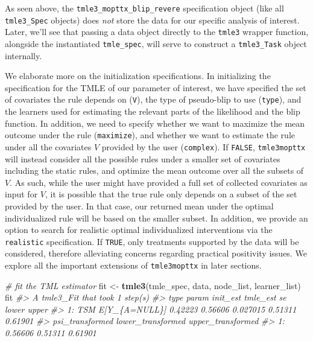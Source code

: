 \documentclass[12pt, krantz2,]{krantz}
\newenvironment{Shaded}{\begin{snugshade}}{\end{snugshade}}
\newcommand{\CommentTok}[1]{\textcolor[rgb]{0.37,0.37,0.37}{\textit{#1}}}
\newcommand{\KeywordTok}[1]{\textcolor[rgb]{0.27,0.27,0.27}{\textbf{#1}}}
\newcommand{\NormalTok}[1]{#1}
\newcommand{\StringTok}[1]{\textcolor[rgb]{0.5,0.5,0.5}{#1}}
\theoremstyle{definition}
\theoremstyle{definition}
\theoremstyle{definition}
\newcommand{\1}{\mathbbm{1}}
\begin{document}
As seen above, the \texttt{tmle3\_mopttx\_blip\_revere} specification object
(like all \texttt{tmle3\_Spec} objects) does \emph{not} store the data for our
specific analysis of interest. Later,
we'll see that passing a data object directly to the \texttt{tmle3} wrapper function,
alongside the instantiated \texttt{tmle\_spec}, will serve to construct a \texttt{tmle3\_Task}
object internally.

We elaborate more on the initialization specifications. In initializing the
specification for the TMLE of our parameter of interest, we have specified the
set of covariates the rule depends on (\texttt{V}), the type of pseudo-blip to use
(\texttt{type}), and the learners used for estimating the relevant parts of the
likelihood and the blip function. In addition, we need to specify whether we
want to maximize the mean outcome under the rule (\texttt{maximize}), and whether we
want to estimate the rule under all the covariates \(V\) provided by the user
(\texttt{complex}). If \texttt{FALSE}, \texttt{tmle3mopttx} will instead consider all the possible
rules under a smaller set of covariates including the static rules, and optimize
the mean outcome over all the subsets of \(V\). As such, while the user might have
provided a full set of collected covariates as input for \(V\), it is possible
that the true rule only depends on a subset of the set provided by the user. In
that case, our returned mean under the optimal individualized rule will be based
on the smaller subset. In addition, we provide an option to search for realistic
optimal individualized interventions via the \texttt{realistic} specification. If
\texttt{TRUE}, only treatments supported by the data will be considered, therefore
alleviating concerns regarding practical positivity issues. We explore all the
important extensions of \texttt{tmle3mopttx} in later sections.

\begin{Shaded}
\begin{Highlighting}[]
\CommentTok{# fit the TML estimator}
\NormalTok{fit <-}\StringTok{ }\KeywordTok{tmle3}\NormalTok{(tmle_spec, data, node_list, learner_list)}
\NormalTok{fit}
\CommentTok{#> A tmle3_Fit that took 1 step(s)}
\CommentTok{#>    type         param init_est tmle_est       se   lower   upper}
\CommentTok{#> 1:  TSM E[Y_\{A=NULL\}]  0.42223  0.56606 0.027015 0.51311 0.61901}
\CommentTok{#>    psi_transformed lower_transformed upper_transformed}
\CommentTok{#> 1:         0.56606           0.51311           0.61901}
\end{Highlighting}
\end{Shaded}
\end{document}
